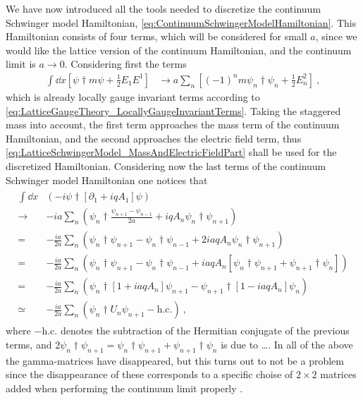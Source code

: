 \documentclass[../main.tex]{subfiles} %
\begin{document}
We have now introduced all the tools needed to discretize the continuum Schwinger model Hamiltonian, \cref{eq:ContinuumSchwingerModelHamiltonian}. This Hamiltonian consists of four terms, which will be considered for small $a$, since we would like the lattice version of the continuum Hamiltonian, and the continuum limit is $a \rightarrow 0$. Considering first the terms
\begin{align} \label{eq:LatticeSchwingerModel_MassAndElectricFieldPart}
    \int \dd{x} \left[ \psi\dagger m \psi + \frac{1}{2} E_1 E^1 \right]
    &\rightarrow a \sum_n \left[ (-1)^n m \psi_n\dagger \psi_n + \frac{1}{2} E_n^2 \right] \: ,
\end{align}
which is already locally gauge invariant terms according to \cref{eq:LatticeGaugeTheory_LocallyGaugeInvariantTerms}. Taking the staggered mass into account, the first term approaches the mass term of the continuum Hamiltonian, and the second approaches the electric field term, thus \cref{eq:LatticeSchwingerModel_MassAndElectricFieldPart} shall be used for the discretized Hamiltonian. Considering now the last terms of the continuum Schwinger model Hamiltonian one notices that
\begin{align} \label{eq:LatticeSchwingerModel_DifferentialPart}
\begin{split}
    \int \dd{x} &\left( -i\psi\dagger \left[ \partial_1 + iqA_1 \right] \psi \right) \\
    \rightarrow& -ia \sum_n \left( \psi_n\dagger \frac{\psi_{n+1} - \psi_{n-1}}{2a} + iqA_n \psi_n\dagger \psi_{n+1} \right) \\
    =& -\frac{ia}{2a} \sum_n \left( \psi_n\dagger \psi_{n+1} - \psi_n\dagger \psi_{n-1} + 2 iaqA_n \psi_n\dagger \psi_{n+1} \right) \\
    =& -\frac{ia}{2a} \sum_n \left( \psi_n\dagger \psi_{n+1} - \psi_n\dagger \psi_{n-1} + iaqA_n \left[ \psi_n\dagger \psi_{n+1} + \psi_{n+1}\dagger \psi_n \right] \right) \\
    =& -\frac{ia}{2a} \sum_n \left( \psi_n\dagger \left[ 1 + iaqA_n \right] \psi_{n+1} - \psi_{n+1}\dagger \left[ 1 - iaqA_n \right] \psi_n \right) \\
    \simeq& -\frac{ia}{2a} \sum_n \left( \psi_n\dagger U_n \psi_{n+1} - \mathrm{h.c.} \right) \: ,
\end{split}
\end{align}
where $-\mathrm{h.c.}$ denotes the subtraction of the Hermitian conjugate of the previous terms, and $2\psi_n\dagger \psi_{n+1} = \psi_n\dagger \psi_{n+1} + \psi_{n+1}\dagger \psi_n$ is due to \ldots . In all of the above the gamma-matrices have disappeared, but this turns out to not be a problem since the disappearance of these corresponds to a specific choise of $2 \times 2$ matrices added when performing the continuum limit properly \cite{panyella_masterThesis_2019}.
\end{document}
